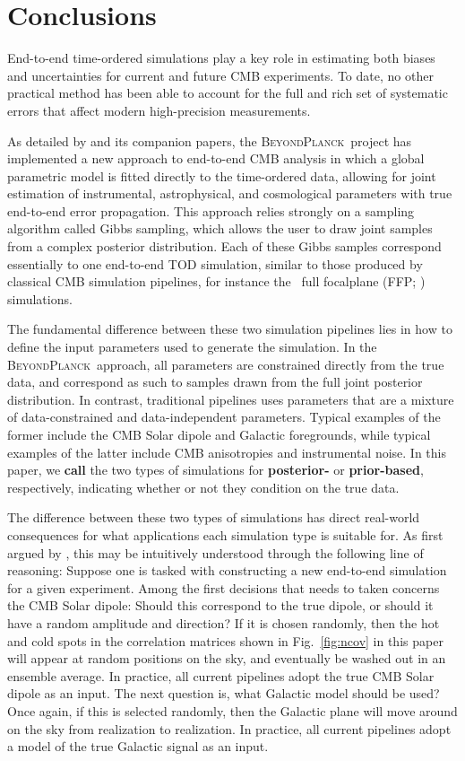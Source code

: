 \documentclass[twocolumn]{aa}%
\newcommand{\BP}{\textsc{BeyondPlanck}}
\begin{document}
\section{Conclusions}
\label{sec:conclusions}

End-to-end time-ordered simulations play a key role in estimating both
biases and uncertainties for current and future CMB experiments. To date, no other practical method has been able to
account for the full and rich set of systematic errors that affect
modern high-precision measurements.

As detailed by \citet{bp01} and its companion papers, the \BP\ project
has implemented a new approach to end-to-end CMB analysis in which a
global parametric model is fitted directly to the time-ordered data,
allowing for joint estimation of instrumental, astrophysical, and
cosmological parameters with true end-to-end error propagation. This
approach relies strongly on a sampling algorithm called Gibbs
sampling, which allows the user to draw joint samples from a complex
posterior distribution. Each of these Gibbs samples correspond
essentially to one end-to-end TOD simulation, similar to those
produced by classical CMB simulation pipelines, for instance the
\Planck\ full focalplane (FFP; \citealp{planck2014-a14})
simulations.

The fundamental difference between these two simulation pipelines lies
in how to define the input parameters used to generate the
simulation. In the \BP\ approach, all parameters are constrained
directly from the true data, and correspond as such to samples drawn
from the full joint posterior distribution. In contrast, traditional
pipelines uses parameters that are a mixture of data-constrained and
data-independent parameters. Typical examples of the former include
the CMB Solar dipole and Galactic foregrounds, while typical examples
of the latter include CMB anisotropies and instrumental noise. In this
paper, we {\bf call} the two types of simulations for {\bf posterior-} or
{\bf prior-based}, respectively, indicating whether or not they
condition on the true data.

The difference between these two types of simulations has direct
real-world consequences for what applications each simulation type is
suitable for. As first argued by \citet{bp10}, this may be intuitively
understood through the following line of reasoning: Suppose one is
tasked with constructing a new end-to-end simulation for a given
experiment. Among the first decisions that needs to taken concerns the
CMB Solar dipole: Should this correspond to the true dipole, or should
it have a random amplitude and direction? If it is chosen randomly,
then the hot and cold spots in the correlation matrices shown in
Fig.~\ref{fig:ncov} in this paper will appear at random positions on
the sky, and eventually be washed out in an ensemble average. In
practice, all current pipelines adopt the true CMB Solar dipole as an
input. The next question is, what Galactic model should be used? Once
again, if this is selected randomly, then the Galactic plane will move
around on the sky from realization to realization. In practice, all
current pipelines adopt a model of the true Galactic signal as an
input.
\end{document}
